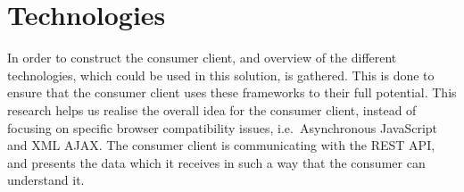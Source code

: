 \section{Technologies} \label{sec:technologies}
In order to construct the consumer client, and overview of the different technologies, which could be used in this solution, is gathered.
This is done to ensure that the consumer client uses these frameworks to their full potential.
This research helps us realise the overall idea for the consumer client, instead of focusing on specific browser compatibility issues, i.e.~Asynchronous JavaScript and XML \ac{AJAX}.
The consumer client is communicating with the REST API, and presents the data which it receives in such a way that the consumer can understand it.
